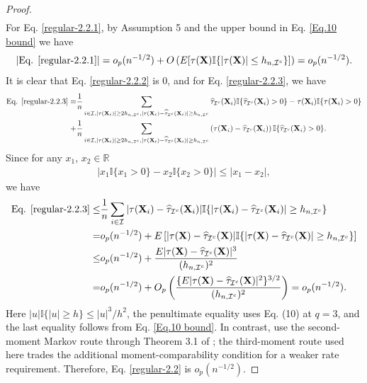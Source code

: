 \documentclass[11pt]{article}
\theoremstyle{referenceplain}
\theoremstyle{referencedefinition}
\theoremstyle{referenceremark}
\begin{document}
\begin{proof}
\begin{align}
    \end{align}
    For Eq. \eqref{regular-2.2.1}, by Assumption 5 and the upper bound in Eq. \eqref{Eq.10 bound} we have
    \begin{align*}
        |\text{Eq. }\eqref{regular-2.2.1}|=o_p(n^{-1/2})+O\left(E[\tau(\mathbf{X})\mathbb{I}\{|\tau(\mathbf{X})|\leq h_{n,\mathcal{I}^c}\}]\right)=o_p(n^{-1/2}).
    \end{align*}
    It is clear that Eq. \eqref{regular-2.2.2} is 0, and for Eq. \eqref{regular-2.2.3}, we have
    \begin{align*}
        \text{Eq. }\eqref{regular-2.2.3}=&\frac{1}{n}\sum_{i\in\mathcal{I},|\tau(\mathbf{X}_i)|\ge 2 h_{n,\mathcal{I}^c}, |\tau(\mathbf{X}_i)-\widehat{\tau}_{\mathcal{I}^c}(\mathbf{X}_i)|\ge h_{n,\mathcal{I}^c}}\widehat{\tau}_{\mathcal{I}^c}(\mathbf{X}_i) \mathbb{I}\{\widehat{\tau}_{\mathcal{I}^c}(\mathbf{X}_i)>0\} - \tau(\mathbf{X}_i)\mathbb{I}\{\tau(\mathbf{X}_i)>0\}\\
        +&\frac{1}{n}\sum_{i\in\mathcal{I},|\tau(\mathbf{X}_i)|\ge 2 h_{n,\mathcal{I}^c}, |\tau(\mathbf{X}_i)-\widehat{\tau}_{\mathcal{I}^c}(\mathbf{X}_i)|\ge h_{n,\mathcal{I}^c}}\left(\tau(\mathbf{X}_i)-\widehat{\tau}_{\mathcal{I}^c}(\mathbf{X}_i)\right)\mathbb{I}\{\widehat{\tau}_{\mathcal{I}^c}(\mathbf{X}_i)>0\}.
    \end{align*}
    Since for any $x_1$, $x_2\in\mathbb{R}$
    \begin{align*}
       | x_1\mathbb{I}\{x_1>0\}-x_2\mathbb{I}\{x_2>0\}|\leq |x_1-x_2|,
    \end{align*}
    we have
    \begin{align*}
        \text{Eq. }\eqref{regular-2.2.3}\leq& \frac{1}{n}\sum_{i\in\mathcal{I}}|\tau(\mathbf{X}_i)-\widehat{\tau}_{\mathcal{I}^c}(\mathbf{X}_i)|\mathbb{I}\{|\tau(\mathbf{X}_i)-\widehat{\tau}_{\mathcal{I}^c}(\mathbf{X}_i)|\ge h_{n,\mathcal{I}^c}\}\\
        =&o_p(n^{-1/2})+E\left[|\tau(\mathbf{X})-\widehat{\tau}_{\mathcal{I}^c}(\mathbf{X})|\mathbb{I}\{|\tau(\mathbf{X})-\widehat{\tau}_{\mathcal{I}^c}(\mathbf{X})|\ge h_{n,\mathcal{I}^c}\}\right]\\
        \leq&o_p(n^{-1/2})+\frac{E|\tau(\mathbf{X})-\widehat{\tau}_{\mathcal{I}^c}(\mathbf{X})|^3}{(h_{n,\mathcal{I}^c})^2}\\
        =&o_p(n^{-1/2})+O_p\left(\frac{\{E|\tau(\mathbf{X})-\widehat{\tau}_{\mathcal{I}^c}(\mathbf{X})|^2\}^{3/2}}{(h_{n,\mathcal{I}^c})^2}\right)=o_p(n^{-1/2}).
    \end{align*}
    Here $|u|\mathbb{I}\{|u|\ge h\}\le |u|^3/h^2$, the penultimate equality uses Eq. (10) at $q=3$, and the last equality follows from Eq. \eqref{Eq.10 bound}. In contrast, \citet{shi2020breaking} use the second-moment Markov route through Theorem 3.1 of \citet{qian2011performance}; the third-moment route used here trades the additional moment-comparability condition for a weaker rate requirement. Therefore, Eq. \eqref{regular-2.2} is $o_p(n^{-1/2})$.
\end{proof}
\end{document}
